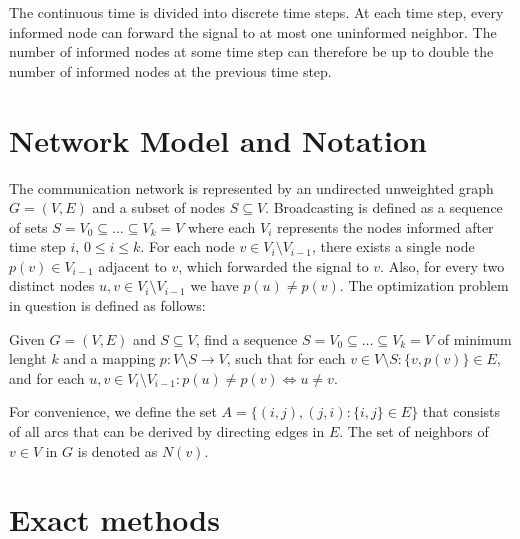 The continuous time is divided into discrete time steps.
At each time step, every informed node can forward the signal to at most one uninformed neighbor.
The number of informed nodes at some time step can therefore be up to double the number of informed nodes at the previous time step.
%
\section{Network Model and Notation}

The communication network is represented by an undirected unweighted graph $G=(V,E)$ and a subset of nodes $S\subseteq V$. 
Broadcasting is defined as a sequence of sets $S=V_0\subseteq\dots\subseteq V_k = V$ where each $V_i$ represents the nodes informed after time step $i$, $0\leq i\leq k$.
For each node $v\in V_i\setminus V_{i-1}$, there exists a single node $p(v)\in V_{i-1}$ adjacent to $v$, which forwarded the signal to $v$.
Also, for every two distinct nodes $u,v\in V_i\setminus V_{i-1}$ we have $p(u)\neq p(v)$.
The optimization problem in question is defined as follows:
\begin{problem}\label{prob:min}
Given $G=(V,E)$ and $S\subseteq V$, find a sequence $S=V_0\subseteq\dots\subseteq V_k=V$ of minimum lenght $k$ 
and a mapping $p:V\setminus S\to V$, such that for each $v\in V\setminus S:\{v,p(v)\}\in E$, and for each $u,v\in V_i\setminus V_{i-1}: p(u)\neq p(v)\Leftrightarrow u\neq v$.
\end{problem}
For convenience, we define the set $A=\{(i,j),(j,i):\{i,j\}\in E\}$ that consists of all arcs that can be derived by directing edges in $E$.
The set of neighbors of $v\in V$ in $G$ is denoted as $N(v)$.
\section{Exact methods}

